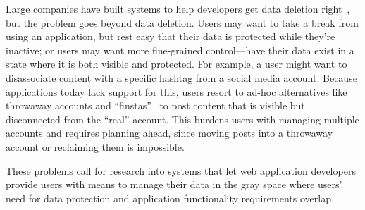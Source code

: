 Large companies have built systems to help developers get data deletion
right~\cite{delf}, but the problem goes beyond data deletion. Users may want to
take a break from using an application, but rest easy that their data is
protected while they’re inactive; or users may want more fine-grained
control—\ie have their data exist in a state where it is both visible and
protected. For example, a user might want to disassociate content with a
specific hashtag from a social media account. Because applications today lack
support for this, users resort to ad-hoc alternatives like throwaway accounts
and ``finstas''~\cite{reddit:throwaway, nytimes:finsta} to post content that is
visible but disconnected from the ``real'' account. This burdens users with
managing multiple accounts and requires planning ahead, since moving posts into
a throwaway account or reclaiming them is impossible.

These problems call for research into systems that let web application
developers provide users with means to manage their data in the gray space where
users' need for data protection and application functionality requirements
overlap. 
